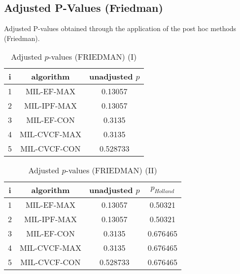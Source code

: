 \documentclass[a4paper,10pt]{article}
\begin{document}
\begin{landscape}
\newpage

\section{Adjusted P-Values (Friedman)}


Adjusted P-values obtained through the application of the post hoc methods (Friedman).

\begin{table}[!htp]
\centering\small
\begin{tabular}{ccc}
i&algorithm&unadjusted $p$\\
\hline1&MIL-EF-MAX&0.13057\\2&MIL-IPF-MAX&0.13057\\3&MIL-EF-CON&0.3135\\4&MIL-CVCF-MAX&0.3135\\5&MIL-CVCF-CON&0.528733\\\hline
\end{tabular}
\caption{Adjusted $p$-values (FRIEDMAN) (I)}
\end{table}
\begin{table}[!htp]
\centering\small
\begin{tabular}{cccc}
i&algorithm&unadjusted $p$&$p_{Holland}$\\
\hline1&MIL-EF-MAX&0.13057&0.50321\\2&MIL-IPF-MAX&0.13057&0.50321\\3&MIL-EF-CON&0.3135&0.676465\\4&MIL-CVCF-MAX&0.3135&0.676465\\5&MIL-CVCF-CON&0.528733&0.676465\\\hline
\end{tabular}
\caption{Adjusted $p$-values (FRIEDMAN) (II)}
\end{table}

\newpage
\end{landscape}
\end{document}
